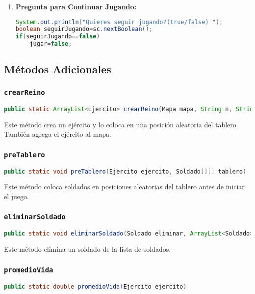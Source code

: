 \begin{enumerate}
  \item \textbf{Pregunta para Continuar Jugando:}
     \begin{lstlisting}[language=Java]
System.out.println("Quieres seguir jugando?(true/false) ");
boolean seguirJugando=sc.nextBoolean();
if(seguirJugando==false)
    jugar=false;
     \end{lstlisting}
\end{enumerate}

\subsection{Métodos Adicionales}

\subsubsection{\texttt{crearReino}}
\begin{lstlisting}[language=Java]
public static ArrayList<Ejercito> crearReino(Mapa mapa, String n, String reinoN)
\end{lstlisting}

Este método crea un ejército y lo coloca en una posición aleatoria del tablero. También agrega el ejército al mapa.

\subsubsection{\texttt{preTablero}}
\begin{lstlisting}[language=Java]
public static void preTablero(Ejercito ejercito, Soldado[][] tablero)
\end{lstlisting}

Este método coloca soldados en posiciones aleatorias del tablero antes de iniciar el juego.

\subsubsection{\texttt{eliminarSoldado}}
\begin{lstlisting}[language=Java]
public static void eliminarSoldado(Soldado eliminar, ArrayList<Soldado> soldados)
\end{lstlisting}

Este método elimina un soldado de la lista de soldados.

\subsubsection{\texttt{promedioVida}}
\begin{lstlisting}[language=Java]
public static double promedioVida(Ejercito ejercito)
\end{lstlisting}

